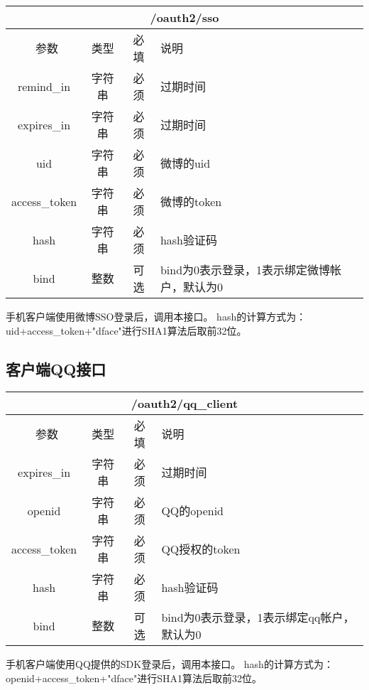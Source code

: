 \documentclass[cs4size]{ctexartutf8}
\begin{document}
\begin{table}[H]
   \begin{center}
\begin{tabular}{|c|c|c|p{12cm}|}
\hline
\multicolumn{4}{|c|}{/oauth2/sso} \\
\hline\hline
 \  参数  & 类型 & 必填 &  说明  \\
\hline
 remind\_in  & 字符串 & 必须 &  过期时间\\
 \hline
 expires\_in  & 字符串 & 必须 &  过期时间\\
  \hline
 uid  & 字符串 & 必须 &  微博的uid\\
  \hline
 access\_token  & 字符串 & 必须 &  微博的token\\
 \hline
 hash  & 字符串 & 必须 &  hash验证码\\
\hline
 bind  & 整数 & 可选 &  bind为0表示登录，1表示绑定微博帐户，默认为0\\
\hline
\end{tabular}
   \end{center}
\end{table}
手机客户端使用微博SSO登录后，调用本接口。
hash的计算方式为：uid+access\_token+"dface"进行SHA1算法后取前32位。


\subsection{客户端QQ接口}
\label{hash_algorithm}

\begin{table}[H]
   \begin{center}
\begin{tabular}{|c|c|c|p{12cm}|}
\hline
\multicolumn{4}{|c|}{/oauth2/qq\_client} \\
\hline\hline
 \  参数  & 类型 & 必填 &  说明  \\
 \hline
 expires\_in  & 字符串 & 必须 &  过期时间\\
  \hline
 openid  & 字符串 & 必须 &  QQ的openid\\
  \hline
 access\_token  & 字符串 & 必须 &  QQ授权的token\\
 \hline
 hash  & 字符串 & 必须 &  hash验证码\\
 \hline
 bind  & 整数 & 可选 &  bind为0表示登录，1表示绑定qq帐户，默认为0\\
\hline
\end{tabular}
   \end{center}
\end{table}
手机客户端使用QQ提供的SDK登录后，调用本接口。
hash的计算方式为：openid+access\_token+"dface"进行SHA1算法后取前32位。
\end{document}

